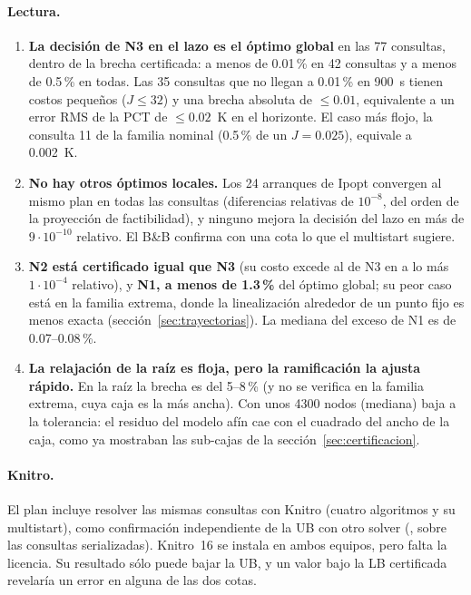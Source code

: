 \paragraph{Lectura.}
\begin{enumerate}
  \item \textbf{La decisión de N3 en el lazo es el óptimo global} en las 77 consultas, dentro de
        la brecha certificada: a menos de 0.01\,\% en 42 consultas y a menos de 0.5\,\% en
        todas. Las 35 consultas que no llegan a 0.01\,\% en 900~s tienen costos pequeños
        ($J\le32$) y una brecha absoluta de $\le0.01$, equivalente a un error RMS de la PCT de
        $\le0.02$~K en el horizonte. El caso más flojo, la consulta 11 de la familia nominal
        (0.5\,\% de un $J=0.025$), equivale a 0.002~K.
  \item \textbf{No hay otros óptimos locales.} Los 24 arranques de Ipopt convergen al mismo plan
        en todas las consultas (diferencias relativas de $10^{-8}$, del orden de la proyección
        de factibilidad), y ninguno mejora la decisión del lazo en más de $9\cdot10^{-10}$
        relativo. El B\&B confirma con una cota lo que el multistart sugiere.
  \item \textbf{N2 está certificado igual que N3} (su costo excede al de N3 en a lo más
        $1\cdot10^{-4}$ relativo), y \textbf{N1, a menos de 1.3\,\%} del óptimo global; su peor
        caso está en la familia extrema, donde la linealización alrededor de un punto fijo es
        menos exacta (sección~\ref{sec:trayectorias}). La mediana del exceso de N1 es de 0.07--0.08\,\%.
  \item \textbf{La relajación de la raíz es floja, pero la ramificación la ajusta rápido.} En la
        raíz la brecha es del 5--8\,\% (y no se verifica en la familia extrema, cuya caja es la
        más ancha). Con unos 4300 nodos (mediana) baja a la tolerancia: el residuo del modelo afín
        cae con el cuadrado del ancho de la caja, como ya mostraban las sub-cajas de la sección~\ref{sec:certificacion}.
\end{enumerate}

\paragraph{Knitro.} El plan incluye resolver las mismas consultas con Knitro (cuatro algoritmos y su
multistart), como confirmación independiente de la UB con otro solver
(, sobre las consultas serializadas). Knitro~16 se instala en ambos
equipos, pero falta la licencia. Su resultado sólo puede bajar la UB, y un valor bajo la LB
certificada revelaría un error en alguna de las dos cotas.

